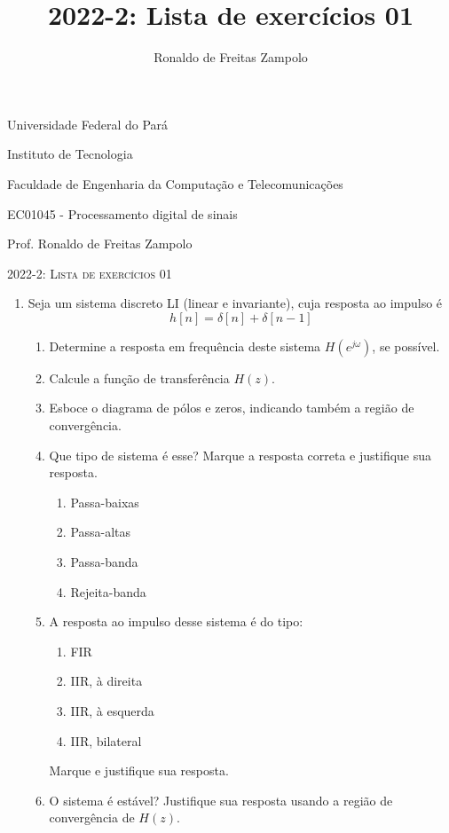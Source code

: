 \documentclass[a4paper,10pt]{article}
\title{2022-2: Lista de exercícios 01}
\author{Ronaldo de Freitas Zampolo}
\begin{document}
Universidade Federal do Pará

Instituto de Tecnologia

Faculdade de Engenharia da Computação e Telecomunicações

EC01045 - Processamento digital de sinais

Prof. Ronaldo de Freitas Zampolo

\begin{center} \textsc{2022-2: Lista de exercícios 01} \end{center}

\begin{enumerate}
	\item Seja um sistema discreto LI (linear e invariante), cuja resposta ao impulso é 
		\begin{equation*}
			h[n] = \delta[n] + \delta[n-1]
		\end{equation*}
		\begin{enumerate}
			\item Determine a resposta em frequência deste sistema $H(e^{j\omega})$, se possível.
			\item Calcule a função de transferência $H(z)$.
			\item Esboce o diagrama de pólos e zeros, indicando também a região de convergência.
			\item Que tipo de sistema é esse? Marque a resposta correta e justifique sua resposta.
				\begin{enumerate}
					\item Passa-baixas
					\item Passa-altas
					\item Passa-banda
					\item Rejeita-banda
				\end{enumerate}
			\item A resposta ao impulso desse sistema é do tipo:
				\begin{enumerate}
					\item FIR
					\item IIR, à direita
					\item IIR, à esquerda
					\item IIR, bilateral
				\end{enumerate}
				Marque e justifique sua resposta.
			\item O sistema é estável? Justifique sua resposta usando a região de convergência de $H(z)$.

\end{enumerate}
\end{enumerate}
\end{document}
